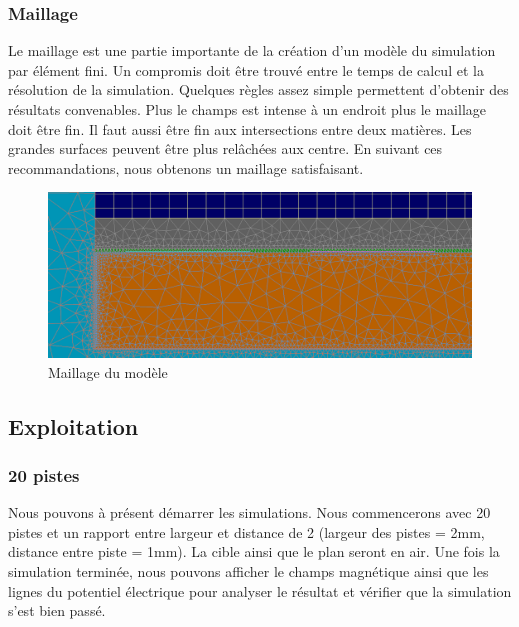 \subsubsection{Maillage}
Le maillage est une partie importante de la création d'un modèle du simulation par élément fini. Un compromis doit être trouvé entre le temps de calcul et la résolution de la simulation. Quelques règles assez simple permettent d'obtenir des résultats convenables. Plus le champs est intense à un endroit plus le maillage doit être fin. Il faut aussi être fin aux intersections entre deux matières. Les grandes surfaces peuvent être plus relâchées aux centre. En suivant ces recommandations, nous obtenons un maillage satisfaisant.


\begin{figure}[!ht]
 \centering
 \includegraphics[width=14cm]{C20maillage.png}
 \caption{Maillage du modèle}
\end{figure}


\subsection{Exploitation}

\subsubsection{20 pistes}
Nous pouvons à présent démarrer les simulations. Nous commencerons avec 20 pistes et un rapport entre largeur et distance de 2 (largeur des pistes = 2mm, distance entre piste = 1mm). La cible ainsi que le plan seront en air. Une fois la simulation terminée, nous pouvons afficher le champs magnétique ainsi que les lignes du potentiel électrique pour analyser le résultat et vérifier que la simulation s'est bien passé.

